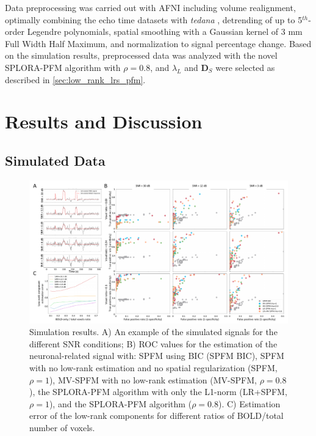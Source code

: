 Data preprocessing was carried out with AFNI \citep{Cox1996AFNISoftwareAnalysis}
including volume realignment, optimally combining the echo time datasets with
\textit{tedana} \citep{DuPre2021TEdependentanalysis}, detrending of up to
5$^{th}$-order Legendre polynomials, spatial smoothing with a Gaussian kernel of
3 mm Full Width Half Maximum, and normalization to signal percentage change.
Based on the simulation results, preprocessed data was analyzed with the novel
SPLORA-PFM algorithm with $\rho = 0.8$, and $\lambda_L$ and $\mathbf{D}_S$ were
selected as described in \cref{sec:low_rank_lrs_pfm}.

\section{Results and Discussion}
\label{sec:low_rank_results}

\subsection{Simulated Data}

\begin{figure}[th!]
    \centering
    \includegraphics[width=\textwidth]{figures/low_rank/figure_1_v6.pdf}
    \caption{Simulation results. A) An example of the simulated signals for the
    different SNR conditions; B) ROC values for the estimation of
    the neuronal-related signal with: SPFM using BIC (SPFM BIC),
    SPFM with no low-rank estimation and no spatial regularization (SPFM,
    $\rho=1$), MV-SPFM with no low-rank estimation (MV-SPFM, $\rho = 0.8$), the
    SPLORA-PFM algorithm with only the L1-norm (LR+SPFM, $\rho=1$), and the
    SPLORA-PFM algorithm ($\rho = 0.8$). C) Estimation error of the low-rank
    components for different ratios of BOLD/total number of voxels.}
    \label{fig:low_rank_1}
\end{figure}

